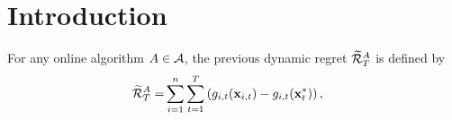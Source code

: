 \documentclass{article}
\begin{document}
\printAffiliationsAndNotice{\icmlEqualContribution} %


\begin{abstract}





\end{abstract}


\section{Introduction}
\label{sect_introduction}

For any online algorithm $A \in {\mathcal{A}}$, the previous dynamic regret $\widetilde{{\mathcal{R}}}_T^{A}$ is defined by
\begin{align}
\label{equa_definition_previous_regret}
\widetilde{{\mathcal{R}}}_T^{A} = &  \sum_{i=1}^n\sum_{t=1}^T \left(  g_{i,t}({\bf x}_{i,t}) - g_{i,t}({\bf x}_t^\ast)  \right),
\end{align} 
\end{document}
